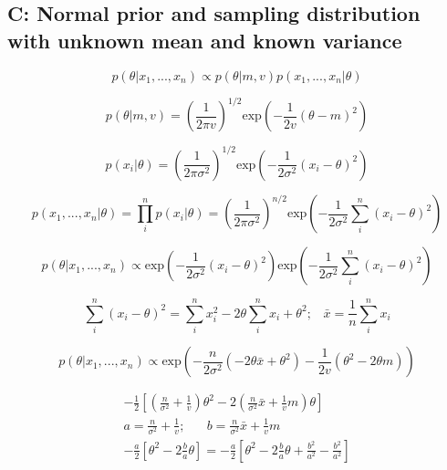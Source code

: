 \documentclass[12pt]{article}
\begin{document}
    \subsection*{C: Normal prior and sampling distribution with unknown mean and known variance}

        \begin{equation}
              p(\theta|x_1,..., x_n) \propto p(\theta|m,v)p(x_1,...,x_n|\theta)
        \end{equation}

        \begin{equation}
              p(\theta|m,v) = \left(\frac{1}{2 \pi v} \right )^{1/2} \text{exp}\left( - \frac{1}{2v} (\theta - m)^2\right )
        \end{equation}

        \begin{equation}
              p(x_i|\theta) = \left(\frac{1}{2 \pi \sigma^2} \right )^{1/2} \text{exp}\left( - \frac{1}{2 \sigma^2} (x_i - \theta)^2\right )
        \end{equation}

        \begin{equation}
              p(x_1,...,x_n|\theta) = \prod_i^n p(x_i|\theta) = \left(\frac{1}{2 \pi \sigma^2} \right )^{n/2} \text{exp}\left( - \frac{1}{2 \sigma^2} \sum_i^n(x_i - \theta)^2\right )
        \end{equation}

        \begin{equation}
              p(\theta|x_1,...,x_n) \propto \text{exp}\left( - \frac{1}{2 \sigma^2} (x_i - \theta)^2\right ) \text{exp}\left( - \frac{1}{2 \sigma^2} \sum_i^n(x_i - \theta)^2\right )
        \end{equation}

        \begin{equation}
              \sum_i^n(x_i - \theta)^2 = \sum_i^n x_i^2 - 2 \theta \sum_i^n x_i + \theta^2; \hspace{10pt} \bar{x} = \frac{1}{n}\sum_i^n x_i
        \end{equation}

        \begin{equation}
              p(\theta|x_1,...,x_n) \propto \text{exp} \left( - \frac{n}{2 \sigma^2} (-2 \theta \bar{x} + \theta^2) - \frac{1}{2v} (\theta^2 - 2\theta m) \right)
        \end{equation}

        \begin{align}
              -\frac{1}{2} \left[ \left( \frac{n}{\sigma^2} + \frac{1}{v}\right) \theta^2 - 2 \left( \frac{n}{\sigma^2} \bar{x} + \frac{1}{v} m \right) \theta  \right] \\
              a=\frac{n}{\sigma^2} + \frac{1}{v}; \hspace{20pt} b = \frac{n}{\sigma^2} \bar{x} + \frac{1}{v}m \\
              -\frac{a}{2} \left [ \theta^2 - 2 \frac{b}{a} \theta \right] = -\frac{a}{2} \left[ \theta^2 - 2 \frac{b}{a} \theta + \frac{b^2}{a^2} - \frac{b^2}{a^2} \right ]
        \end{align}
\end{document}
